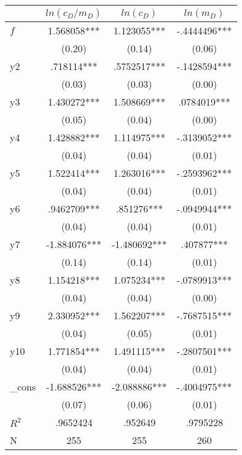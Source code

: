 \begin{tabular}{lccc}
            &   $ln(c_D/m_D)$   &   $ln(c_D)$   &     $ln(m_D)$   \\
\hline
$f$    &    1.568058***&    1.123055***&   -.4444496***\\
            &      (0.20)   &      (0.14)   &      (0.06)   \\
y2          &     .718114***&    .5752517***&   -.1428594***\\
            &      (0.03)   &      (0.03)   &      (0.00)   \\
y3          &    1.430272***&    1.508669***&    .0784019***\\
            &      (0.05)   &      (0.04)   &      (0.00)   \\
y4          &    1.428882***&    1.114975***&   -.3139052***\\
            &      (0.04)   &      (0.04)   &      (0.01)   \\
y5          &    1.522414***&    1.263016***&   -.2593962***\\
            &      (0.04)   &      (0.04)   &      (0.01)   \\
y6          &    .9462709***&     .851276***&   -.0949944***\\
            &      (0.04)   &      (0.04)   &      (0.01)   \\
y7          &   -1.884076***&   -1.480692***&     .407877***\\
            &      (0.14)   &      (0.14)   &      (0.01)   \\
y8          &    1.154218***&    1.075234***&   -.0789913***\\
            &      (0.04)   &      (0.04)   &      (0.00)   \\
y9          &    2.330952***&    1.562207***&   -.7687515***\\
            &      (0.04)   &      (0.05)   &      (0.01)   \\
y10         &    1.771854***&    1.491115***&   -.2807501***\\
            &      (0.04)   &      (0.04)   &      (0.01)   \\
\_cons       &   -1.688526***&   -2.088886***&   -.4004975***\\
            &      (0.07)   &      (0.06)   &      (0.01)   \\
$R^2$       &    .9652424   &     .952649   &    .9795228   \\
N           &         255   &         255   &         260   \\
\end{tabular}